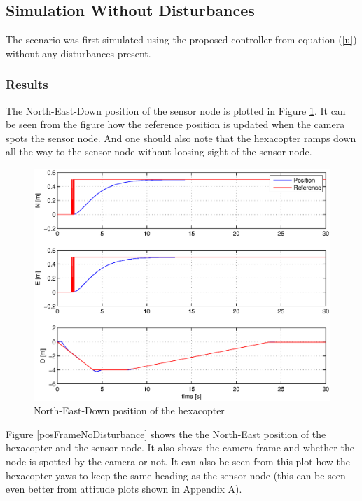 \subsection{Simulation Without Disturbances}
The scenario was first simulated using the proposed controller from equation (\ref{u}) without any disturbances present.
\subsubsection{Results}
The North-East-Down position of the sensor node is plotted in Figure \ref{posNoDisturbance}. It can be seen from the figure how the reference position is updated when the camera spots the sensor node. And one should also note that the hexacopter ramps down all the way to the sensor node without loosing sight of the sensor node. 
\begin{figure}[H]
\centering
\includegraphics[width = 12cm]{fig/plots/simulation/positionNoDisturbance.eps}
\caption{North-East-Down position of the hexacopter}
\label{posNoDisturbance}
\end{figure}
\noindent
Figure \ref{posFrameNoDisturbance} shows the the North-East position of the hexacopter and the sensor node. It also shows the camera frame and whether the node is spotted by the camera or not. It can also be seen from this plot how the hexacopter yaws to keep the same heading as the sensor node (this can be seen even better from attitude plots shown in  Appendix A). 
